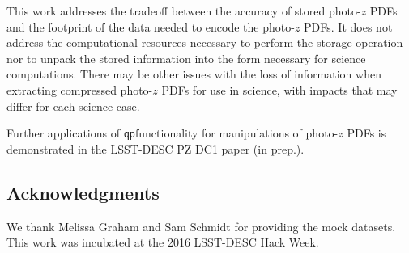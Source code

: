 \documentclass[\docopts]{\docclass}
\newcommand{\qp}{\texttt{qp}}
\begin{document}
This work addresses the tradeoff between the accuracy of stored photo-$z$ PDFs 
and the footprint of the data needed to encode the photo-$z$ PDFs.  It does not 
address the computational resources necessary to perform the storage operation 
nor to unpack the stored information into the form necessary for science 
computations.  There may be other issues with the loss of information when 
extracting compressed photo-$z$ PDFs for use in science, with impacts that may 
differ for each science case.

Further applications of \qp functionality for manipulations of photo-$z$ PDFs 
is demonstrated in the LSST-DESC PZ DC1 paper (in prep.).

\subsection*{Acknowledgments}


We thank Melissa Graham and Sam Schmidt for providing the mock datasets.  This 
work was incubated at the 2016 LSST-DESC Hack Week.







\end{document}
